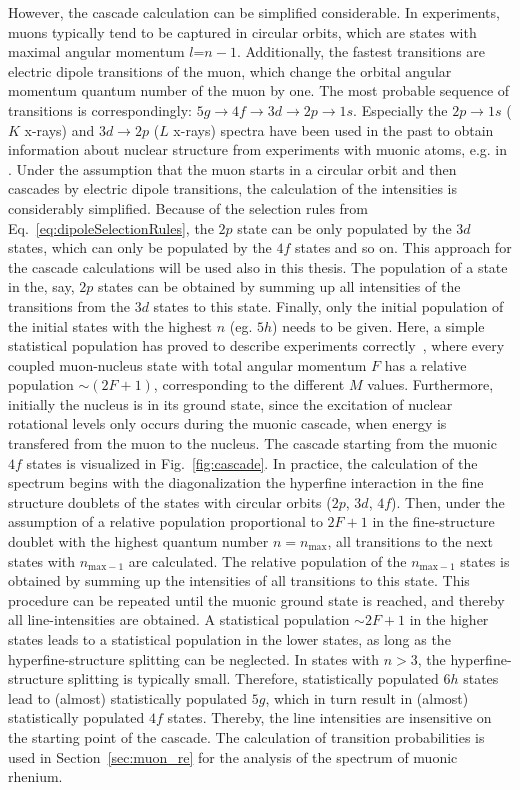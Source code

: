 However, the cascade calculation can be simplified considerable. In experiments, muons typically tend to be captured in circular orbits, which are states with maximal angular momentum $l$=$n-1$. Additionally, the fastest transitions are electric dipole transitions of the muon, which change the orbital angular momentum quantum number of the muon by one. The most probable sequence of transitions is correspondingly: $5g\rightarrow 4f \rightarrow 3d \rightarrow 2p \rightarrow 1s$. Especially the $2p\rightarrow 1s$ ($K$ x-rays) and $3d\rightarrow 2p$ ($L$ x-rays) spectra have been used in the past to obtain information about nuclear structure from experiments with muonic atoms, e.g. in \cite{tanaka1983,tanaka1984,tanaka1984_2,hitlin1970,Dey1979,dewit1966,Bergem1988}. Under the assumption that the muon starts in a circular orbit and then cascades by electric dipole transitions, the calculation of the intensities is considerably simplified. Because of the selection rules from Eq.~\eqref{eq:dipoleSelectionRules}, the $2p$ state can be only populated by the $3d$ states, which can only be populated by the $4f$ states and so on. This approach for the cascade calculations will be used also in this thesis. The population of a state in the, say, $2p$ states can be obtained by summing up all intensities of the transitions from the $3d$ states to this state. Finally, only the initial population of the initial states with the highest $n$ (eg. $5h$) needs to be given. Here, a simple statistical population has proved to describe experiments correctly~\cite{Dey1979}, where every coupled muon-nucleus state with total angular momentum $F$ has a relative population $\sim (2F+1)$, corresponding to the different $M$ values. Furthermore, initially the nucleus is in its ground state, since the excitation of nuclear rotational levels only occurs during the muonic cascade, when energy is transfered from the muon to the nucleus.
The cascade starting from the muonic $4f$ states is visualized in Fig.~\ref{fig:cascade}. In practice, the calculation of the spectrum begins with the diagonalization the hyperfine interaction in the fine structure doublets of the states with circular orbits ($2p$, $3d$, $4f$). Then, under the assumption of a relative population proportional to $2F+1$ in the fine-structure doublet with the highest quantum number $n=n_{\text{max}}$, all transitions to the next states with $n_{\text{max}-1}$ are calculated. The relative population of the $n_{\text{max}-1}$ states is obtained by summing up the intensities of all transitions to this state. This procedure can be repeated until the muonic ground state is reached, and thereby all line-intensities are obtained. A statistical population $\sim 2F+1$ in the higher states leads to a statistical population in the lower states, as long as the hyperfine-structure  splitting can be neglected. In states with $n>3$, the hyperfine-structure splitting is typically small. Therefore, statistically populated $6h$ states lead to (almost) statistically populated $5g$, which in turn result in (almost) statistically populated $4f$ states. Thereby, the line intensities are insensitive on the starting point of the cascade. The calculation of transition probabilities is used in Section~\ref{sec:muon_re} for the analysis of the spectrum of muonic rhenium.
